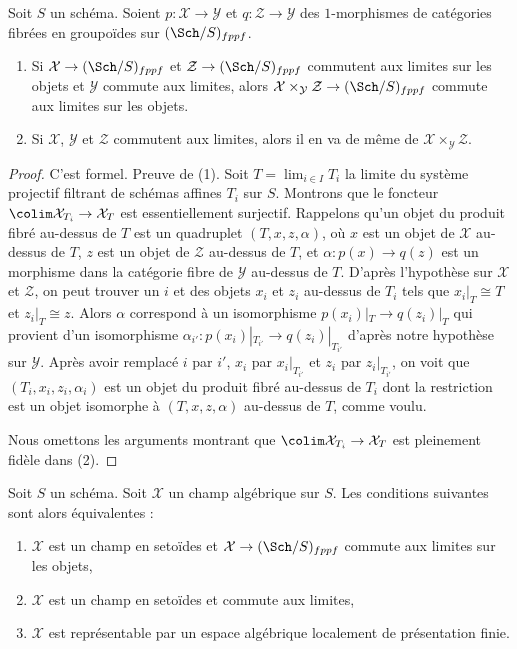 \begin{lemma}
\label{lemma-fibre-product-limit-preserving}
Soit $S$ un schéma. Soient $p : \mathcal{X} \to \mathcal{Y}$ et
$q : \mathcal{Z} \to \mathcal{Y}$ des $1$-morphismes de catégories
fibrées en groupoïdes sur $(\Sch/S)_{fppf}$.
\begin{enumerate}
\item Si $\mathcal{X} \to (\Sch/S)_{fppf}$ et
$\mathcal{Z} \to (\Sch/S)_{fppf}$ commutent aux limites sur les objets et
$\mathcal{Y}$ commute aux limites, alors
$\mathcal{X} \times_\mathcal{Y} \mathcal{Z} \to (\Sch/S)_{fppf}$ commute
aux limites sur les objets.
\item Si $\mathcal{X}$, $\mathcal{Y}$
et $\mathcal{Z}$ commutent aux limites, alors il en va de même de
$\mathcal{X} \times_\mathcal{Y} \mathcal{Z}$.
\end{enumerate}
\end{lemma}

\begin{proof}
C'est formel. Preuve de (1). Soit $T = \lim_{i \in I} T_i$ la limite
du système projectif filtrant de schémas affines $T_i$ sur $S$. Montrons que le foncteur
$\colim \mathcal{X}_{T_i} \to \mathcal{X}_T$ est essentiellement surjectif.
Rappelons qu'un objet du produit fibré au-dessus de $T$ est un quadruplet
$(T, x, z, \alpha)$, où $x$ est un objet de $\mathcal{X}$ au-dessus de $T$,
$z$ est un objet de $\mathcal{Z}$ au-dessus de $T$, et
$\alpha : p(x) \to q(z)$ est un morphisme dans la catégorie fibre de
$\mathcal{Y}$ au-dessus de $T$. D'après l'hypothèse sur $\mathcal{X}$ et $\mathcal{Z}$,
on peut trouver un $i$ et des objets $x_i$ et $z_i$ au-dessus de $T_i$ tels que
$x_i|_T \cong T$ et $z_i|_T \cong z$. Alors $\alpha$ correspond à
un isomorphisme $p(x_i)|_T \to q(z_i)|_T$ qui provient d'un isomorphisme
$\alpha_{i'} : p(x_i)|_{T_{i'}} \to q(z_i)|_{T_{i'}}$ d'après notre hypothèse sur
$\mathcal{Y}$. Après avoir remplacé $i$ par $i'$, $x_i$ par $x_i|_{T_{i'}}$ et
$z_i$ par $z_i|_{T_{i'}}$, on voit que $(T_i, x_i, z_i, \alpha_i)$
est un objet du produit fibré au-dessus de $T_i$ dont la restriction est
un objet isomorphe à $(T, x, z, \alpha)$ au-dessus de $T$, comme voulu.

\medskip\noindent
Nous omettons les arguments montrant que $\colim \mathcal{X}_{T_i} \to \mathcal{X}_T$
est pleinement fidèle dans (2).
\end{proof}

\begin{lemma}
\label{lemma-limit-preserving-algebraic-space}
Soit $S$ un schéma. Soit $\mathcal{X}$ un champ algébrique sur $S$.
Les conditions suivantes sont alors équivalentes :
\begin{enumerate}
\item $\mathcal{X}$ est un champ en setoïdes et
$\mathcal{X} \to (\Sch/S)_{fppf}$ commute aux limites sur les objets,
\item $\mathcal{X}$ est un champ en setoïdes et commute aux limites,
\item $\mathcal{X}$ est représentable par un espace algébrique
localement de présentation finie.
\end{enumerate}
\end{lemma}

